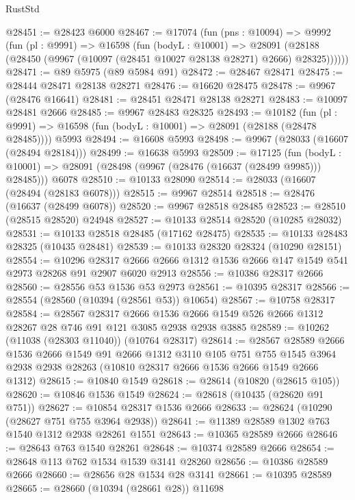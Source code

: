 \begin{lexlean}{RustStd}
\begin{coremodule}
@28451 := @28423 @6000
@28467 := @17074
    (fun (pns : @10094) =>
    @9992
      (fun (pl : @9991) =>
      @16598
        (fun (bodyL : @10001) =>
        @28091 (@28188 (@28450 (@9967 (@10097 (@28451 @10027 @28138 @28271) @2666) @28325))))))
@28471 := @89 @5975 (@89 @5984 @91)
@28472 := @28467 @28471
@28475 := @28444 @28471 @28138 @28271
@28476 := @16620 @28475
@28478 := @9967 (@28476 @16641)
@28481 := @28451 @28471 @28138 @28271
@28483 := @10097 @28481 @2666
@28485 := @9967 @28483 @28325
@28493 := @10182
    (fun (pl : @9991) => @16598 (fun (bodyL : @10001) => @28091 (@28188 (@28478 @28485))))
    @5993
@28494 := @16608 @5993
@28498 := @9967 (@28033 (@16607 (@28494 @28184)))
@28499 := @16638 @5993
@28509 := @17125
    (fun (bodyL : @10001) => @28091 (@28498 (@9967 (@28476 (@16637 (@28499 @9985))) @28485)))
    @6078
@28510 := @10133 @28090
@28514 := @28033 (@16607 (@28494 (@28183 @6078)))
@28515 := @9967 @28514
@28518 := @28476 (@16637 (@28499 @6078))
@28520 := @9967 @28518 @28485
@28523 := @28510 (@28515 @28520) @24948
@28527 := @10133 @28514 @28520 (@10285 @28032)
@28531 := @10133 @28518 @28485 (@17162 @28475)
@28535 := @10133 @28483 @28325 (@10435 @28481)
@28539 := @10133 @28320 @28324 (@10290 @28151)
@28554 := @10296
    @28317
    @2666
    @2666
    @1312
    @1536
    @2666
    @147
    @1549
    @541
    @2973
    @28268
    @91
    @2907
    @6020
    @2913
@28556 := @10386 @28317 @2666
@28560 := @28556 @53 @1536 @53 @2973
@28561 := @10395 @28317
@28566 := @28554 (@28560 (@10394 (@28561 @53)) @10654)
@28567 := @10758 @28317
@28584 := @28567
    @28317
    @2666
    @1536
    @2666
    @1549
    @526
    @2666
    @1312
    @28267
    @28
    @746
    @91
    @121
    @3085
    @2938
    @2938
    @3885
@28589 := @10262 (@11038 (@28303 @11040)) (@10764 @28317)
@28614 := @28567
    @28589
    @2666
    @1536
    @2666
    @1549
    @91
    @2666
    @1312
    @3110
    @105
    @751
    @755
    @1545
    @3964
    @2938
    @2938
    @28263
    (@10810 @28317 @2666 @1536 @2666 @1549 @2666 @1312)
@28615 := @10840 @1549
@28618 := @28614 (@10820 (@28615 @105))
@28620 := @10846 @1536 @1549
@28624 := @28618 (@10435 (@28620 @91 @751))
@28627 := @10854 @28317 @1536 @2666
@28633 := @28624 (@10290 (@28627 @751 @755 @3964 @2938))
@28641 := @11389 @28589 @1302 @763 @1540 @1312 @2938 @28261 @1551
@28643 := @10365 @28589 @2666
@28646 := @28643 @763 @1540 @28261
@28648 := @10374 @28589 @2666
@28654 := @28648 @113 @762 @1534 @1539 @3141 @28260
@28656 := @10386 @28589 @2666
@28660 := @28656 @28 @1534 @28 @3141
@28661 := @10395 @28589
@28665 := @28660 (@10394 (@28661 @28)) @11698

\end{coremodule}
\end{lexlean}
